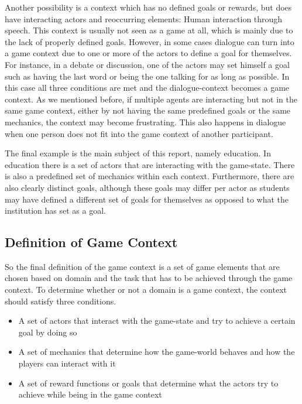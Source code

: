 \documentclass[11pt]{article}
\begin{document}
Another possibility is a context which has no defined goals or rewards, but does have interacting actors and reoccurring elements: Human interaction through speech. This context is usually not seen as a game at all, which is mainly due to the lack of properly defined goals. However, in some cases dialogue can turn into a game context due to one or more of the actors to define a goal for themselves. For instance, in a debate or discussion, one of the actors may set himself a goal such as having the last word or being the one talking for as long as possible. In this case all three conditions are met and the dialogue-context becomes a game context. As we mentioned before, if multiple agents are interacting but not in the same game context, either by not having the same predefined goals or the same mechanics, the context may become frustrating. This also happens in dialogue when one person does not fit into the game context of another participant.

The final example is the main subject of this report, namely education. In education there is a set of actors that are interacting with the game-state. There is also a predefined set of mechanics within each context. Furthermore, there are also clearly distinct goals, although these goals may differ per actor as students may have defined a different set of goals for themselves as opposed to what the institution has set as a goal.

\subsection{Definition of Game Context}
So the final definition of the game context is a set of game elements that are chosen based on domain and the task that has to be achieved through the game context. To determine whether or not a domain is a game context, the context should satisfy three conditions.

\begin{itemize}
  \item A set of actors that interact with the game-state and try to achieve a certain goal by doing so
  \item A set of mechanics that determine how the game-world behaves and how the players can interact with it
  \item A set of reward functions or goals that determine what the actors try to achieve while being in the game context
\end{itemize}
\end{document}
